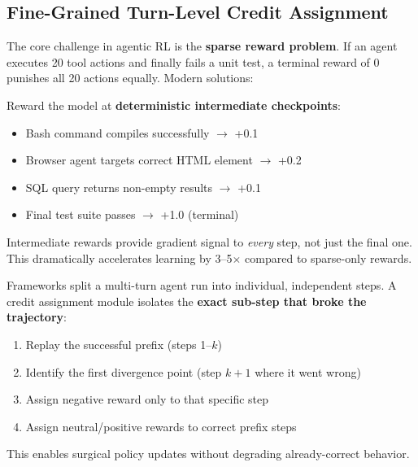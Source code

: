 \subsection{Fine-Grained Turn-Level Credit Assignment}
\label{fine-grained-turn-level-credit-assignment}

The core challenge in agentic RL is the \textbf{sparse reward problem}. If an agent executes 20 tool actions and finally fails a unit test, a terminal reward of $0$ punishes all 20 actions equally. Modern solutions:

\begin{keybox}
Reward the model at \textbf{deterministic intermediate checkpoints}:

\begin{itemize}
  \item Bash command compiles successfully $\rightarrow$ +0.1
  \item Browser agent targets correct HTML element $\rightarrow$ +0.2
  \item SQL query returns non-empty results $\rightarrow$ +0.1
  \item Final test suite passes $\rightarrow$ +1.0 (terminal)
\end{itemize}

Intermediate rewards provide gradient signal to \emph{every} step, not just the final one. This dramatically accelerates learning by 3--5$\times$ compared to sparse-only rewards.
\end{keybox}

\begin{keybox}
Frameworks split a multi-turn agent run into individual, independent steps. A credit assignment module isolates the \textbf{exact sub-step that broke the trajectory}:

\begin{enumerate}
  \item Replay the successful prefix (steps 1--$k$)
  \item Identify the first divergence point (step $k+1$ where it went wrong)
  \item Assign negative reward only to that specific step
  \item Assign neutral/positive rewards to correct prefix steps
\end{enumerate}

This enables surgical policy updates without degrading already-correct behavior.
\end{keybox}

